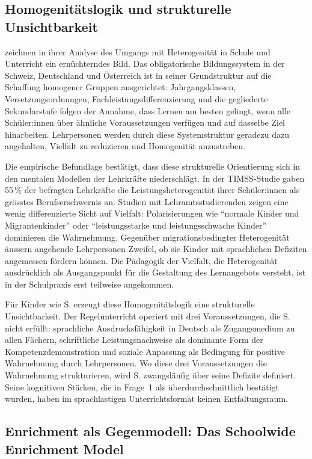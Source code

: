 \documentclass[ngerman, a4paper]{article}
\begin{document}
\subsection{Homogenitätslogik und strukturelle Unsichtbarkeit}

\textcite[S.\,9--10]{buholzerkummerwyss2010heterogenitaet} zeichnen in ihrer
Analyse des Umgangs mit Heterogenität
in Schule und Unterricht ein ernüchterndes Bild. Das obligatorische Bildungssystem in
der Schweiz, Deutschland und Österreich ist in seiner Grundstruktur auf die Schaffung
homogener Gruppen ausgerichtet: Jahrgangsklassen, Versetzungsordnungen,
Fachleistungsdifferenzierung und die gegliederte Sekundarstufe folgen der Annahme,
dass Lernen am besten gelingt, wenn alle Schüler:innen über ähnliche Voraussetzungen
verfügen und auf dasselbe Ziel hinarbeiten. Lehrpersonen werden durch diese
Systemstruktur geradezu dazu angehalten, Vielfalt zu reduzieren und Homogenität
anzustreben.

Die empirische Befundlage bestätigt, dass diese strukturelle Orientierung sich in den
mentalen Modellen der Lehrkräfte niederschlägt. In der TIMSS-Studie gaben 55\,\%
der befragten Lehrkräfte die Leistungsheterogenität ihrer Schüler:innen als grösstes
Berufserschwernis an. Studien mit Lehramtsstudierenden zeigen eine wenig differenzierte
Sicht auf Vielfalt: Polarisierungen wie \enquote{normale Kinder und Migrantenkinder} oder
\enquote{leistungsstarke und leistungsschwache Kinder} dominieren die Wahrnehmung.
Gegenüber migrationsbedingter Heterogenität äussern angehende Lehrpersonen Zweifel,
ob sie Kinder mit sprachlichen Defiziten angemessen fördern können. Die Pädagogik
der Vielfalt, die Heterogenität ausdrücklich als Ausgangspunkt für die Gestaltung
des Lernangebots versteht, ist in der Schulpraxis erst teilweise angekommen.

Für Kinder wie S. erzeugt diese Homogenitätslogik eine strukturelle Unsichtbarkeit.
Der Regelunterricht operiert mit drei Voraussetzungen, die S. nicht erfüllt: sprachliche
Ausdrucksfähigkeit in Deutsch als Zugangsmedium zu allen Fächern, schriftliche
Leistungsnachweise als dominante Form der Kompetenzdemonstration und soziale
Anpassung als Bedingung für positive Wahrnehmung durch Lehrpersonen. Wo diese drei
Voraussetzungen die Wahrnehmung strukturieren, wird S. zwangsläufig über seine Defizite
definiert. Seine kognitiven Stärken, die in Frage~1 als überdurchschnittlich bestätigt
wurden, haben im sprachlastigen Unterrichtsformat keinen Entfaltungsraum.

\subsection{Enrichment als Gegenmodell: Das Schoolwide Enrichment Model}
\end{document}
